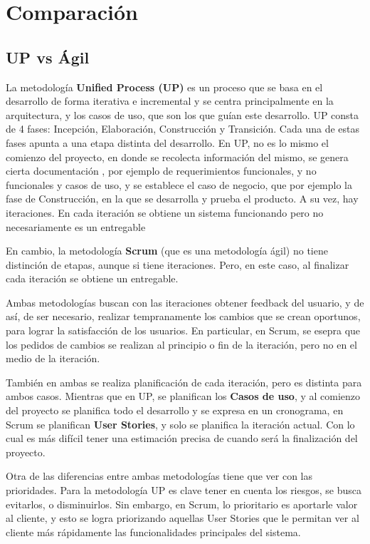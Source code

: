 \section{Comparación}

\subsection{UP vs Ágil}

La metodología \textbf{Unified Process (UP)} es un proceso que se basa en el desarrollo de forma iterativa e incremental y se centra principalmente en la arquitectura, y los casos de uso, que son los que guían este desarrollo.
UP consta de 4 fases: Incepción, Elaboración, Construcción y Transición. Cada una de estas fases apunta a una etapa distinta del desarrollo. En UP, no es lo mismo el comienzo del proyecto, en donde se recolecta información del mismo, se genera cierta documentación , por ejemplo de requerimientos funcionales, y no funcionales y casos de uso, y se establece el caso de negocio, que por ejemplo la fase de Construcción, en la que se desarrolla y prueba el producto. 
A su vez, hay iteraciones. En cada iteración se obtiene un sistema funcionando pero no necesariamente es un entregable

En cambio, la metodología \textbf{Scrum} (que es una metodología ágil) no tiene distinción de etapas, aunque si tiene iteraciones. Pero, en este caso, al finalizar cada iteración se obtiene un entregable.

Ambas metodologías buscan con las iteraciones obtener feedback del usuario, y de así, de ser necesario, realizar tempranamente los cambios que se crean oportunos, para lograr la satisfacción de los usuarios. En particular, en Scrum, se esepra que los pedidos de cambios se realizan al principio o fin de la iteración, pero no en el medio de la iteración.

También en ambas se realiza planificación de cada iteración, pero es distinta para ambos casos. Mientras que en UP, se planifican los \textbf{Casos de uso}, y al comienzo del proyecto se planifica todo el desarrollo y se expresa en un cronograma, en Scrum se planifican \textbf{User Stories}, y solo se planifica la iteración actual. Con lo cual es más difícil tener una estimación precisa de cuando será la finalización del proyecto.

Otra de las diferencias entre ambas metodologías tiene que ver con las prioridades. Para la metodología UP es clave tener en cuenta los riesgos, se busca evitarlos, o disminuirlos. Sin embargo, en Scrum, lo prioritario es aportarle valor al cliente, y esto se logra priorizando aquellas User Stories que le permitan ver al cliente más rápidamente las funcionalidades principales del sistema.

